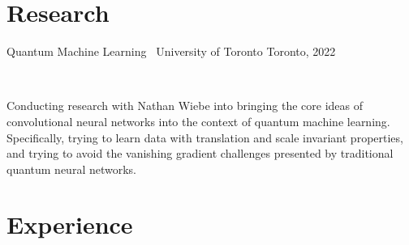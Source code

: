 \documentclass[]{style}
\begin{document}
\section{Research}

\begin{entrylist}

\vspace{2mm}

\entry
{Quantum Machine Learning \ {\normalfont University of Toronto}}
{Toronto, 2022}
{ ~ \vspace{-2.5mm}

Conducting research with Nathan Wiebe into bringing the core ideas of convolutional neural networks into the context of quantum machine learning. Specifically, trying to learn data with translation and scale invariant properties, and trying to avoid the vanishing gradient challenges presented by traditional quantum neural networks.
}

\end{entrylist}

\section{Experience}
\end{document}
